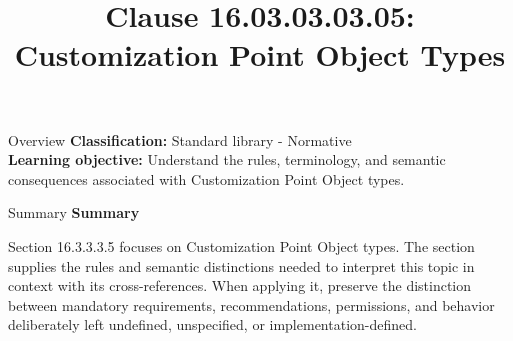 \documentclass[10pt,letterpaper]{article}
\title{Clause 16.03.03.03.05: Customization Point Object Types}
\author{}
\date{}
\begin{document}
\maketitle
\begin{CornellOverviewBox}{Overview}
\textbf{Classification:} Standard library - Normative\\[2pt]
\textbf{Learning objective:} Understand the rules, terminology, and semantic consequences associated with Customization Point Object types.
\end{CornellOverviewBox}\begin{CornellSummaryBox}{Summary}
{\sffamily\bfseries\color{Accent} Summary}\par\vspace{3pt}Section 16.3.3.3.5 focuses on Customization Point Object types. The section supplies the rules and semantic distinctions needed to interpret this topic in context with its cross-references. When applying it, preserve the distinction between mandatory requirements, recommendations, permissions, and behavior deliberately left undefined, unspecified, or implementation-defined.
\end{CornellSummaryBox}
\end{document}
